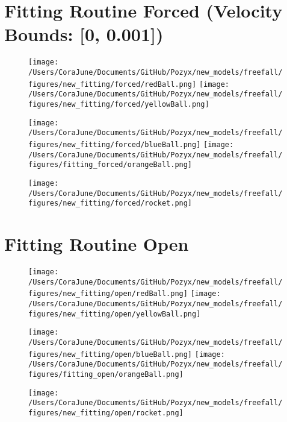 \documentclass{article}
\begin{document}
\section{Fitting Routine Forced (Velocity Bounds: [0, 0.001])}
\begin{figure}[h!]
\begin{multicols}{2}
    \texttt{[image: /Users/CoraJune/Documents/GitHub/Pozyx/new\_models/freefall/figures/new\_fitting/forced/redBall.png]}
    \texttt{[image: /Users/CoraJune/Documents/GitHub/Pozyx/new\_models/freefall/figures/new\_fitting/forced/yellowBall.png]}
\end{multicols}

\begin{multicols}{2}
    \texttt{[image: /Users/CoraJune/Documents/GitHub/Pozyx/new\_models/freefall/figures/new\_fitting/forced/blueBall.png]}
    \texttt{[image: /Users/CoraJune/Documents/GitHub/Pozyx/new\_models/freefall/figures/fitting\_forced/orangeBall.png]}
\end{multicols}

\texttt{[image: /Users/CoraJune/Documents/GitHub/Pozyx/new\_models/freefall/figures/new\_fitting/forced/rocket.png]}

\end{figure}
\newpage
\section{Fitting Routine Open}
\begin{figure}[h!]
\begin{multicols}{2}
    \texttt{[image: /Users/CoraJune/Documents/GitHub/Pozyx/new\_models/freefall/figures/new\_fitting/open/redBall.png]}
    \texttt{[image: /Users/CoraJune/Documents/GitHub/Pozyx/new\_models/freefall/figures/new\_fitting/open/yellowBall.png]}
\end{multicols}

\begin{multicols}{2}
    \texttt{[image: /Users/CoraJune/Documents/GitHub/Pozyx/new\_models/freefall/figures/new\_fitting/open/blueBall.png]}
    \texttt{[image: /Users/CoraJune/Documents/GitHub/Pozyx/new\_models/freefall/figures/fitting\_open/orangeBall.png]}
\end{multicols}

\texttt{[image: /Users/CoraJune/Documents/GitHub/Pozyx/new\_models/freefall/figures/new\_fitting/open/rocket.png]}


\end{figure}
\end{document}
